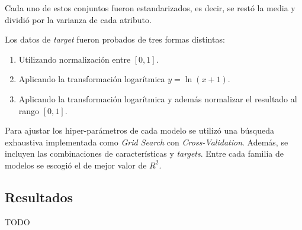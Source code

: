 \documentclass[spanish]{article}
\begin{document}
        Cada uno de estos conjuntos fueron estandarizados, es decir, se restó la media y dividió por la varianza 
        de cada atributo.
        
        Los datos de \emph{target} fueron probados de tres formas distintas:
        \begin{enumerate}
          \item Utilizando normalización entre $[0, 1]$.
          \item Aplicando la transformación logarítmica $y=\ln(x+1)$.
          \item Aplicando la transformación logarítmica y además normalizar el resultado al rango $[0, 1]$.
        \end{enumerate}
        
        Para ajustar los hiper-parámetros de cada modelo se utilizó una búsqueda exhaustiva implementada como 
        \emph{Grid Search} con \emph{Cross-Validation}. Además, se incluyen las combinaciones de características 
        y \emph{targets}. Entre cada familia de modelos se escogió el de mejor valor de $R^2$.
          
        
      \subsection{Resultados}
      
          TODO
  
\end{document}
